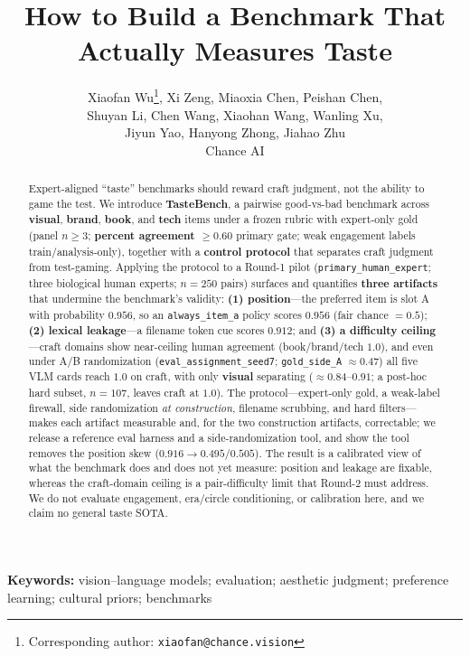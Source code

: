 \documentclass[11pt,a4paper]{article}
\title{How to Build a Benchmark That Actually Measures Taste}
\author{%
Xiaofan Wu\thanks{Corresponding author: \texttt{xiaofan@chance.vision}}, Xi Zeng, Miaoxia Chen, Peishan Chen,\\
Shuyan Li, Chen Wang, Xiaohan Wang, Wanling Xu,\\
Jiyun Yao, Hanyong Zhong, Jiahao Zhu\\[4pt]
Chance AI
}
\date{}
\begin{document}
\maketitle

\begin{abstract}
Expert-aligned ``taste'' benchmarks should reward craft judgment, not the ability to game the test. We introduce \textbf{TasteBench}, a pairwise good-vs-bad benchmark across \textbf{visual}, \textbf{brand}, \textbf{book}, and \textbf{tech} items under a frozen rubric with expert-only gold (panel $n \ge 3$; \textbf{percent agreement $\ge 0.60$} primary gate; weak engagement labels train/analysis-only), together with a \textbf{control protocol} that separates craft judgment from test-gaming. Applying the protocol to a Round-1 pilot (\texttt{primary\_human\_expert}; three biological human experts; $n=250$ pairs) surfaces and quantifies \textbf{three artifacts} that undermine the benchmark's validity: \textbf{(1) position}---the preferred item is slot A with probability $0.956$, so an \texttt{always\_item\_a} policy scores $0.956$ (fair chance $=0.5$); \textbf{(2) lexical leakage}---a filename token cue scores $0.912$; and \textbf{(3) a difficulty ceiling}---craft domains show near-ceiling human agreement (book/brand/tech $1.0$), and even under A/B randomization (\texttt{eval\_assignment\_seed7}; \texttt{gold\_side\_A} $\approx 0.47$) all five VLM cards reach $1.0$ on craft, with only \textbf{visual} separating ($\approx 0.84$--$0.91$; a post-hoc hard subset, $n=107$, leaves craft at $1.0$). The protocol---expert-only gold, a weak-label firewall, side randomization \emph{at construction}, filename scrubbing, and hard filters---makes each artifact measurable and, for the two construction artifacts, correctable; we release a reference eval harness and a side-randomization tool, and show the tool removes the position skew ($0.916 \rightarrow 0.495/0.505$). The result is a calibrated view of what the benchmark does and does not yet measure: position and leakage are fixable, whereas the craft-domain ceiling is a pair-difficulty limit that Round-2 must address. We do not evaluate engagement, era/circle conditioning, or calibration here, and we claim no general taste SOTA.
\end{abstract}

\noindent\textbf{Keywords:} vision--language models; evaluation; aesthetic judgment; preference learning; cultural priors; benchmarks

\end{document}
